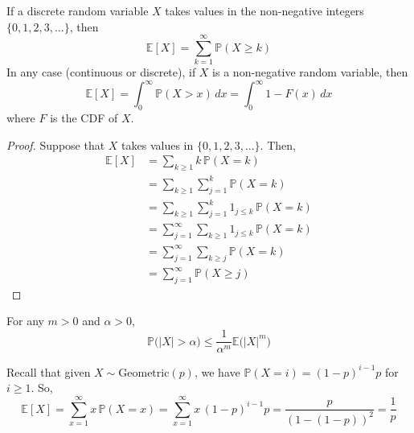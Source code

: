 \documentclass{article}
\begin{document}
    \begin{theorem}
      If a discrete random variable $X$ takes values in the non-negative integers $\{0, 1, 2, 3, ...\}$, then 
      \begin{equation}
        \mathbb{E}[X] = \sum_{k=1}^\infty \mathbb{P}(X \geq k)
      \end{equation}
      In any case (continuous or discrete), if $X$ is a non-negative random variable, then 
      \begin{equation}
        \mathbb{E}[X] = \int_0^\infty \mathbb{P}(X > x) \, dx = \int_0^\infty 1 - F(x) \, dx
      \end{equation}
      where $F$ is the CDF of $X$. 
    \end{theorem}
    \begin{proof}
      Suppose that $X$ takes values in $\{0, 1, 2, 3, ...\}$. Then, 
      \begin{align*}
        \mathbb{E}[X] & = \sum_{k \geq 1} k \, \mathbb{P}(X=k) \\
        & = \sum_{k\geq 1} \sum_{j=1}^k \mathbb{P}(X = k) \\
        & = \sum_{k \geq 1} \sum_{j=1}^k 1_{j \leq k} \, \mathbb{P}(X=k) \\
        & = \sum_{j=1}^\infty \sum_{k \geq 1} 1_{j \leq k} \, \mathbb{P}(X =k) \\
        & = \sum_{j=1}^\infty \sum_{k \geq j} \mathbb{P}(X=k) \\
        & = \sum_{j=1}^\infty \mathbb{P}(X \geq j)
      \end{align*}
    \end{proof}

    \begin{corollary}
      For any $m > 0$ and $\alpha > 0$,  
      \begin{equation}
        \mathbb{P} \big(|X| > \alpha \big) \leq \frac{1}{\alpha^m} \mathbb{E} \big( |X|^m \big)
      \end{equation}
    \end{corollary}

    \begin{example}[Geometric RV]
      Recall that given $X \sim \mathrm{Geometric}(p)$, we have $\mathbb{P}(X = i) = (1 - p)^{i-1} p$ for $i \geq 1$. So, 
      \begin{equation}
        \mathbb{E}[X] = \sum_{x=1}^\infty x \, \mathbb{P}(X = x) = \sum_{x=1}^\infty x \, (1 - p)^{i-1} p = \frac{p}{(1 - (1 - p))^2} = \frac{1}{p}
      \end{equation}
    \end{example}
\end{document}
